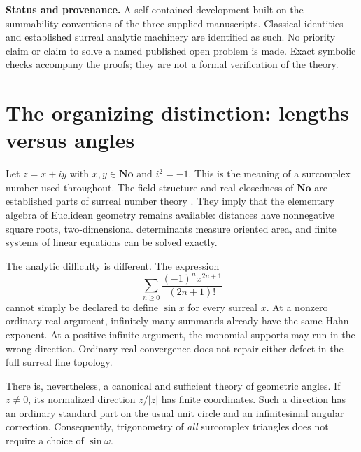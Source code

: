 \documentclass[11pt]{article}
\numberwithin{equation}{section}
\theoremstyle{definition}
\newcommand{\No}{\mathbf{No}}
\begin{document}
\begin{titlepage}
\begin{minipage}{0.94\textwidth}
\begin{abstract}
Finally, we classify the freedom in extending circular trigonometry to infinite real arguments. Such extensions exist and may be fine-locally analytic, but the usual local identities do not determine their infinite phases, and they necessarily acquire infinite periods. All infinite evaluations in the article have set-sized, locally finite Hahn support. Neither sequential convergence nor an unqualified transfer of real analysis is assumed.
\end{abstract}
\end{minipage}
\vfill
\begin{minipage}{0.94\textwidth}\small
\textbf{Status and provenance.} A self-contained development built on the summability conventions of the three supplied manuscripts. Classical identities and established surreal analytic machinery are identified as such. No priority claim or claim to solve a named published open problem is made. Exact symbolic checks accompany the proofs; they are not a formal verification of the theory.
\end{minipage}
\end{titlepage}
\begingroup
\small
\setlength{\parskip}{0pt}
\tableofcontents
\endgroup
\clearpage

\section{The organizing distinction: lengths versus angles}\label{sec:intro}
Let $z=x+iy$ with $x,y\in\No$ and $i^2=-1$. This is the meaning of a surcomplex number used throughout. The field structure and real closedness of $\No$ are established parts of surreal number theory \cite{Conway,Gonshor,Alling}. They imply that the elementary algebra of Euclidean geometry remains available: distances have nonnegative square roots, two-dimensional determinants measure oriented area, and finite systems of linear equations can be solved exactly.

The analytic difficulty is different. The expression
\[
 \sum_{n\ge0}\frac{(-1)^nx^{2n+1}}{(2n+1)!}
\]
cannot simply be declared to define $\sin x$ for every surreal $x$. At a nonzero ordinary real argument, infinitely many summands already have the same Hahn exponent. At a positive infinite argument, the monomial supports may run in the wrong direction. Ordinary real convergence does not repair either defect in the full surreal fine topology.

There is, nevertheless, a canonical and sufficient theory of geometric angles. If $z\ne0$, its normalized direction $z/|z|$ has finite coordinates. Such a direction has an ordinary standard part on the usual unit circle and an infinitesimal angular correction. Consequently, trigonometry of \emph{all} surcomplex triangles does not require a choice of $\sin\omega$.
\end{document}
